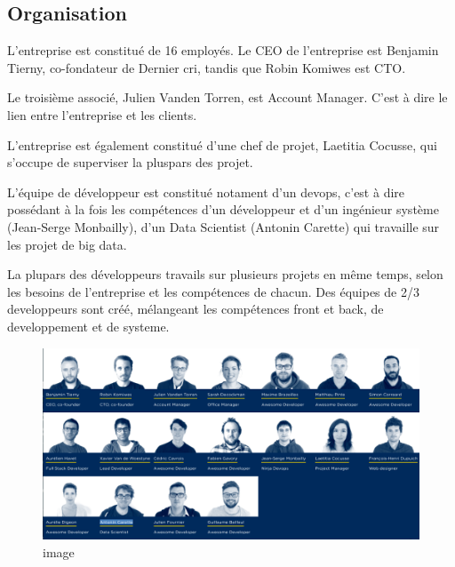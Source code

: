 \documentclass[12pt,a4paper]{article}
\begin{document}
  \bigskip

  \subsection{Organisation}\label{organisation}

  \bigskip

  L'entreprise est constitué de 16 employés. Le CEO de l'entreprise est
  Benjamin Tierny, co-fondateur de Dernier cri, tandis que Robin Komiwes
  est CTO.

  \bigskip

  Le troisième associé, Julien Vanden Torren, est Account Manager. C'est à
  dire le lien entre l'entreprise et les clients.

  \bigskip

  L'entreprise est également constitué d'une chef de projet, Laetitia
  Cocusse, qui s'occupe de superviser la pluspars des projet.

  \bigskip

  L'équipe de développeur est constitué notament d'un devops, c'est à dire
  possédant à la fois les compétences d'un développeur et d'un ingénieur
  système (Jean-Serge Monbailly), d'un Data Scientist (Antonin Carette)
  qui travaille sur les projet de big data.

  \bigskip

  La plupars des développeurs travails sur plusieurs projets en même
  temps, selon les besoins de l'entreprise et les compétences de chacun.
  Des équipes de 2/3 developpeurs sont créé, mélangeant les compétences
  front et back, de developpement et de systeme.

  \bigskip

  \begin{figure}
  \centering
  \includegraphics{team.png}
  \caption{image}
  \end{figure}
\end{document}
